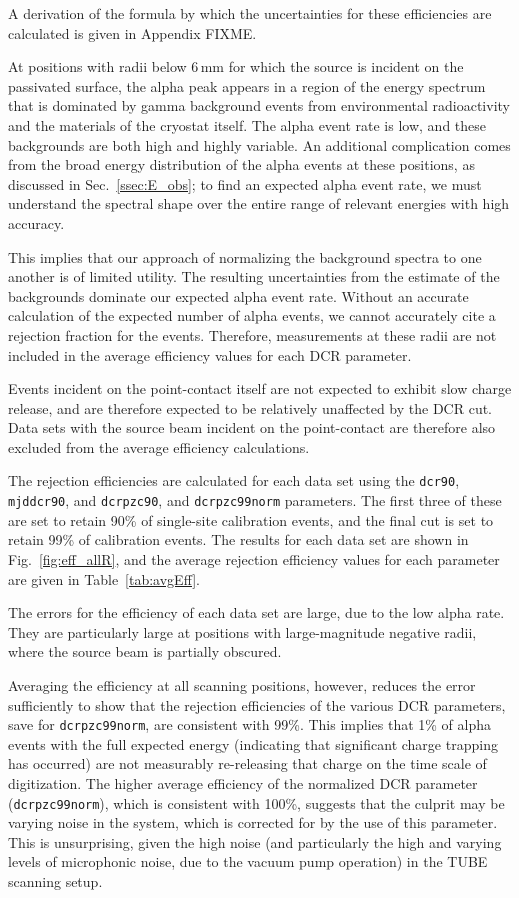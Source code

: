 A derivation of the formula by which the uncertainties for these efficiencies are calculated is given in Appendix FIXME. 

At positions with radii below 6\,mm for which the source is incident on the passivated surface, the alpha peak appears in a region of the energy spectrum that is dominated by gamma background events from environmental radioactivity and the materials of the cryostat itself. The alpha event rate is low, and these backgrounds are both high and highly variable. An additional complication comes from the broad energy distribution of the alpha events at these positions, as discussed in Sec.~\ref{ssec:E_obs}; to find an expected alpha event rate, we must understand the spectral shape over the entire range of relevant energies with high accuracy. 

This implies that our approach of normalizing the background spectra to one another is of limited utility.  The resulting uncertainties from the estimate of the backgrounds dominate our expected alpha event rate. Without an accurate calculation of the expected number of alpha events, we cannot accurately cite a rejection fraction for the events. Therefore, measurements at these radii are not included in the average efficiency values for each DCR parameter. 

Events incident on the point-contact itself are not expected to exhibit slow charge release, and are therefore expected to be relatively unaffected by the DCR cut. Data sets with the source beam incident on the point-contact are therefore also excluded from the average efficiency calculations. 

The rejection efficiencies are calculated for each data set using the {\tt dcr90}, {\tt mjddcr90}, and {\tt dcrpzc90}, and {\tt dcrpzc99norm} parameters. The first three of these are set to retain 90\% of single-site calibration events, and the final cut is set to retain 99\% of calibration events. The results for each data set are shown in Fig.~\ref{fig:eff_allR}, and the average rejection efficiency values for each parameter are given in Table~\ref{tab:avgEff}. 

The errors for the efficiency of each data set are large, due to the low alpha rate. They are particularly large at positions with large-magnitude negative radii, where the source beam is partially obscured. 

Averaging the efficiency at all scanning positions, however, reduces the error sufficiently to show that the rejection efficiencies of the various DCR parameters, save for {\tt dcrpzc99norm}, are consistent with 99\%. This implies that 1\% of alpha events with the full expected energy (indicating that significant charge trapping has occurred) are not measurably re-releasing that charge on the time scale of digitization. The higher average efficiency of the normalized DCR parameter ({\tt dcrpzc99norm}), which is consistent with 100\%, suggests that the culprit may be varying noise in the system, which is corrected for by the use of this parameter. This is unsurprising, given the high noise (and particularly the high and varying levels of microphonic noise, due to the vacuum pump operation) in the TUBE scanning setup. 

